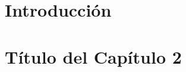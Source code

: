 \documentclass[spanish,a4paper,12pt,oneside]{extreport}
\begin{document}
\pagestyle{myheadings} %



\renewcommand{\thepage}{\roman{page}}
\setcounter{page}{1}
\pagestyle{plain} 


\tableofcontents

\newpage{\pagestyle{empty}}

\listoffigures

\newpage{\pagestyle{empty}}

\listoftables

\newpage{\pagestyle{empty}}

\newpage
\thispagestyle{empty}

\renewcommand{\thepage}{\arabic{page}}
\setcounter{page}{1}
\pagestyle{plain}

\chapter{\LARGE Introducción}
\label{chapter:intro}



\newpage{\pagestyle{empty}}
\thispagestyle{empty}

\chapter{\LARGE Título del Capítulo 2}
\label{chapter:dos}



\newpage{\pagestyle{empty}}
\thispagestyle{empty}
\end{document}
